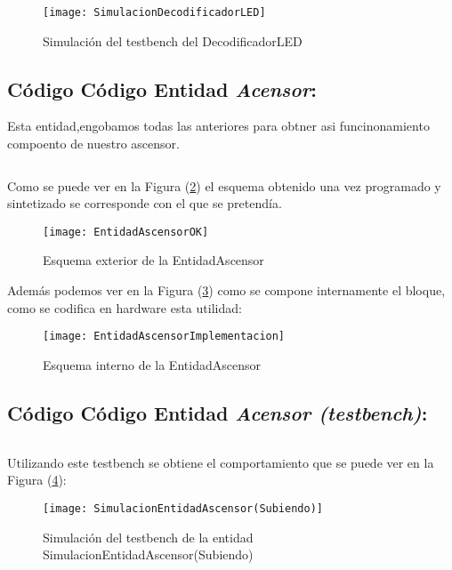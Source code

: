     \begin{figure}[H]
		    \centering
		    \texttt{[image: SimulacionDecodificadorLED]}
		    \caption{Simulación del testbench del DecodificadorLED}
		    \label{fig:SimulacionDecodificadorLED}
	\end{figure}
\subsection{Código Código Entidad \textit{Acensor}:} \label{code:Acensor}
Esta entidad,engobamos todas las anteriores para obtner asi funcinonamiento compoento de nuestro ascensor. \\ 
	\inputminted[frame=lines,fontsize=\footnotesize,linenos]{vhdl}{CodeFiles/EntidadAscensor.vhd}

	Como se puede ver en la Figura (\ref{fig:EntidadAscensorOK}) el esquema obtenido una vez programado y sintetizado se corresponde con el que se pretendía.
    \begin{figure}[H]
		    \centering
		    \texttt{[image: EntidadAscensorOK]}
		    \caption{Esquema exterior de la EntidadAscensor}
		    \label{fig:EntidadAscensorOK}
	\end{figure}
    Además podemos ver en la Figura (\ref{fig:EntidadAscensorImplementacion}) como se compone internamente el bloque, como se codifica en hardware esta utilidad:
    \begin{figure}[H]
		    \centering
		    \texttt{[image: EntidadAscensorImplementacion]}
		    \caption{Esquema interno de la EntidadAscensor}
		    \label{fig:EntidadAscensorImplementacion}
	\end{figure}

\subsection{Código Código Entidad \textit{Acensor (testbench)}:} \label{code:Acensor_tb}
\inputminted[frame=lines,fontsize=\footnotesize,linenos]{vhdl}{CodeFiles/EntidadAscensor_tb.vhd}

    Utilizando este testbench se obtiene el comportamiento que se puede ver en la Figura (\ref{fig:SimulacionEntidadAscensor}):

    \begin{figure}[H]
		    \centering
		    \texttt{[image: SimulacionEntidadAscensor(Subiendo)]}
		    \caption{Simulación del testbench de la entidad SimulacionEntidadAscensor(Subiendo)}
		    \label{fig:SimulacionEntidadAscensor}
	\end{figure}
